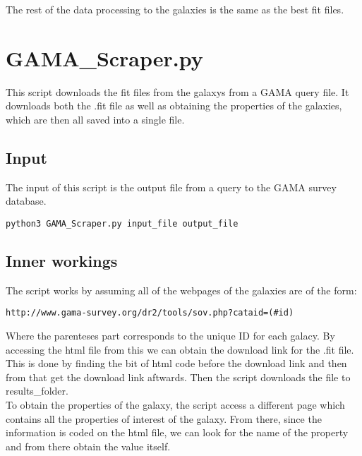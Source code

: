 \documentclass[11pt]{article}
\begin{document}
The rest of the data processing to the galaxies is the same as the best fit files.


\newpage



\section{GAMA\_Scraper.py}

This script downloads the fit files from the galaxys from a GAMA query file. It downloads both the .fit file as well as obtaining the properties of the galaxies, which are then all saved into a single file.

\subsection{Input}

The input of this script is the output file from a query to the GAMA survey database.

\begin{verbatim}
python3 GAMA_Scraper.py input_file output_file
\end{verbatim}

\subsection{Inner workings}

The script works by assuming all of the webpages of the galaxies are of the form:

\begin{verbatim}
http://www.gama-survey.org/dr2/tools/sov.php?cataid=(#id)
\end{verbatim}

Where the parenteses part corresponds to the unique ID for each galacy. By accessing the html file from this we can obtain the download link for the .fit file.\\

This is done by finding the bit of html code before the download link and then from that get the download link aftwards. Then the script downloads the file to results\_folder.\\

To obtain the properties of the galaxy, the script access a different page which contains all the properties of interest of the galaxy. From there, since the information is coded on the html file, we can look for the name of the property and from there obtain the value itself.\\
\end{document}
